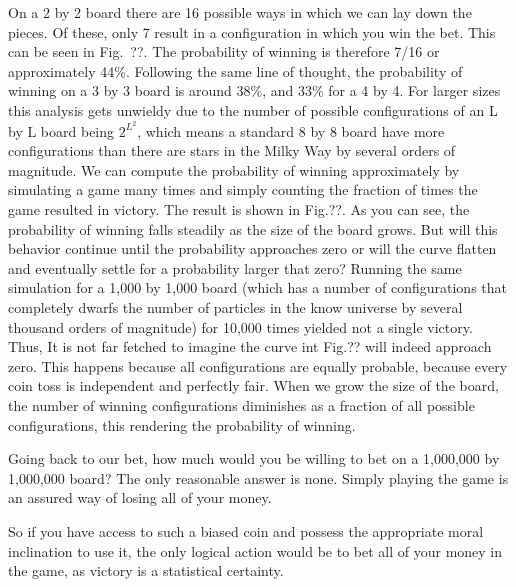 On a 2 by 2 board there are 16 possible ways in which we can lay down the
pieces. Of these, only 7 result in a configuration in which you win the bet.
This can be seen in Fig.~??. The probability of winning is therefore 7/16 or
approximately 44\%. Following the same line of thought, the probability of
winning on a 3 by 3 board is around 38\%, and 33\% for a 4 by 4. For larger
sizes this analysis gets unwieldy due to the number of possible configurations
of an L by L board being $2^{L^2}$, which means a standard 8 by 8 board have
more configurations than there are stars in the Milky Way by several orders of
magnitude. We can compute the probability of winning approximately by
simulating a game many times and simply counting the fraction of times the game
resulted in victory. The result is shown in Fig.??. As you can see, the
probability of winning falls steadily as the size of the board grows. But will
this behavior continue until the probability approaches zero or will the curve
flatten and eventually settle for a probability larger that zero? Running the
same simulation for a 1,000 by 1,000 board (which has a number of
configurations that completely dwarfs the number of particles in the know
universe by several thousand orders of magnitude) for 10,000 times yielded not
a single victory. Thus, It is not far fetched to imagine the curve int Fig.??
will indeed approach zero.
This happens because all configurations are equally probable, because every
coin toss is independent and perfectly fair. When we grow the size of the
board, the number of winning configurations diminishes as a fraction of all
possible configurations, this rendering the probability of winning.

Going back to our bet, how much would you be willing to bet on a 1,000,000 by
1,000,000 board? The only reasonable answer is none. Simply playing the game 
is an assured way of losing all of your money.

So if you have access to such a biased coin and possess the appropriate moral
inclination to use it, the only logical action would be to bet all of your
money in the game, as victory is a statistical certainty.
